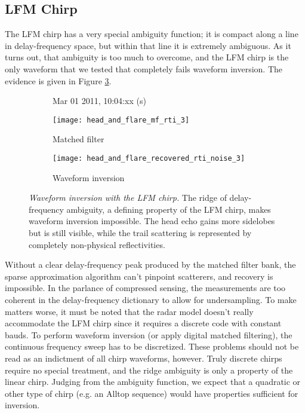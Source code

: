 \subsection{LFM Chirp}
The LFM chirp has a very special ambiguity function; it is compact along a line in delay-frequency space, but within that line it is extremely ambiguous. As it turns out, that ambiguity is too much to overcome, and the LFM chirp is the only waveform that we tested that completely fails waveform inversion. The evidence is given in Figure \ref{fig:lfm_comparison}.
\begin{figure}[tpb]
 \vspace{-1.5\baselineskip}
 \begin{subfigure}{\textwidth}
  \centering
  \textsf{\footnotesize Mar 01 2011, 10:04:xx (s)}
  
  \texttt{[image: head\_and\_flare\_mf\_rti\_3]}
  \caption{Matched filter}
  \label{fig:lfm_mf}
 \end{subfigure}
 
 \vspace{0.5\baselineskip}
 \begin{subfigure}{\textwidth}
  \centering
  \texttt{[image: head\_and\_flare\_recovered\_rti\_noise\_3]}
  \caption{Waveform inversion}
  \label{fig:lfm_recovered}
 \end{subfigure}
 \caption[Waveform inversion with the LFM chirp]{\emph{Waveform inversion with the LFM chirp.} The ridge of delay-frequency ambiguity, a defining property of the LFM chirp, makes waveform inversion impossible. The head echo gains more sidelobes but is still visible, while the trail scattering is represented by completely non-physical reflectivities.}
 \label{fig:lfm_comparison}
\end{figure}%
Without a clear delay-frequency peak produced by the matched filter bank, the sparse approximation algorithm can't pinpoint scatterers, and recovery is impossible. In the parlance of compressed sensing, the measurements are too coherent in the delay-frequency dictionary to allow for undersampling. To make matters worse, it must be noted that the radar model doesn't really accommodate the LFM chirp since it requires a discrete code with constant bauds. To perform waveform inversion (or apply digital matched filtering), the continuous frequency sweep has to be discretized. These problems should not be read as an indictment of all chirp waveforms, however. Truly discrete chirps require no special treatment, and the ridge ambiguity is only a property of the linear chirp. Judging from the ambiguity function, we expect that a quadratic or other type of chirp (e.g. an Alltop sequence) would have properties sufficient for inversion.

